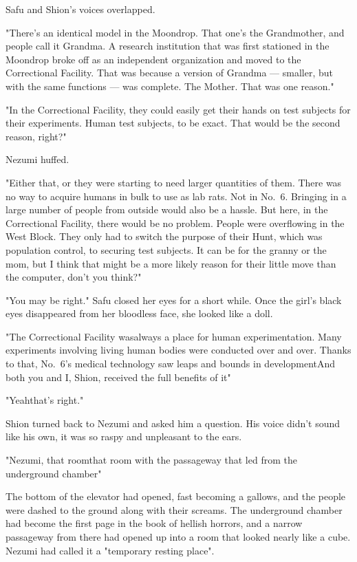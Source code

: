 Safu and Shion's voices overlapped.

"There's an identical model in the Moondrop. That one's the Grandmother,
and people call it Grandma. A research institution that was first
stationed in the Moondrop broke off as an independent organization and
moved to the Correctional Facility. That was because a version of
Grandma --- smaller, but with the same functions --- was complete. The
Mother. That was one reason."

"In the Correctional Facility, they could easily get their hands on test
subjects for their experiments. Human test subjects, to be exact. That
would be the second reason, right?"

Nezumi huffed.

"Either that, or they were starting to need larger quantities of them.
There was no way to acquire humans in bulk to use as lab rats. Not in
No.~6. Bringing in a large number of people from outside would also be a
hassle. But here, in the Correctional Facility, there would be no
problem. People were overflowing in the West Block. They only had to
switch the purpose of their Hunt, which was population control, to
securing test subjects. It can be for the granny or the mom, but I think
that might be a more likely reason for their little move than the
computer, don't you think?"

"You may be right." Safu closed her eyes for a short while. Once the
girl's black eyes disappeared from her bloodless face, she looked like a
doll.

"The Correctional Facility was\el always a place for human
experimentation. Many experiments involving living human bodies were
conducted over and over. Thanks to that, No.~6's medical technology saw
leaps and bounds in development\el And both you and I, Shion, received
the full benefits of it\el "

"Yeah\el that's right."

Shion turned back to Nezumi and asked him a question. His voice didn't
sound like his own, it was so raspy and unpleasant to the ears.

"Nezumi, that room\el that room with the passageway that led from the
underground chamber\el "

The bottom of the elevator had opened, fast becoming a gallows, and the
people were dashed to the ground along with their screams. The
underground chamber had become the first page in the book of hellish
horrors, and a narrow passageway from there had opened up into a room
that looked nearly like a cube. Nezumi had called it a "temporary
resting place".

